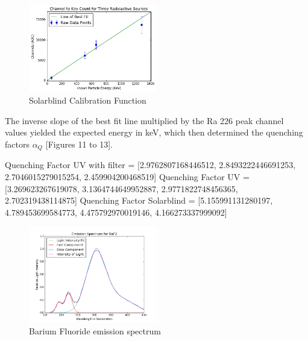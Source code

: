 \documentclass{article}
\begin{document}
\begin{figure}
  \centering
    \includegraphics[width=0.5\textwidth]{chansb.png}
  \caption{Solarblind Calibration Function}
  \label{fig:workflowedge}
\end{figure} 


The inverse slope of the best fit line multiplied by the Ra 226 peak channel values yielded the expected energy in keV, which then determined the quenching factors $\alpha_Q$ [Figures 11 to 13]. 

\setlength{\parskip}{2em}
\noindent
Quenching Factor UV with filter = [2.9762807168446512, 2.8493222446691253, 2.7046015279015254, 2.459904200468519]
\noindent
Quenching Factor UV = [3.269623267619078, 3.1364744649952887, 2.9771822748456365, 2.702319438114875]
\noindent
Quenching Factor Solarblind = [5.155991131280197, 4.789453699584773, 4.475792970019146, 4.166273337999092]

\begin{figure}
  \centering
    \includegraphics[width=0.5\textwidth]{FitsBaF2.png}
  \caption{Barium Fluoride emission spectrum}
  \label{fig:workflowedge}
\end{figure}
\end{document}
